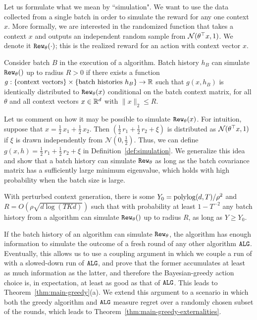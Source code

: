 Let us formulate what we mean by ``simulation". We want to use the data collected from a single batch in order to simulate the reward for any one context $x$. More formally, we are interested in the randomized function that takes a context $x$ and outputs an independent random sample from $\mathcal{N}(\theta^{\top} x, 1)$. We denote it $\mathtt{Rew}_{\theta}(\cdot)$; this is the realized reward for an action with context vector $x$.



\begin{definition}
Consider batch $B$ in the execution of a \GreedyStyle algorithm. Batch history $h_B$ can simulate $\mathtt{Rew}_{\theta}()$ up to radius $R>0$ if there exists a function
    $g: \{\text{context vectors}\}\times \{ \text{batch histories $h_B$}\} \to \mathbb{R}$
such that $g(x,h_B)$ is identically distributed to $\mathtt{Rew}_{\theta}(x)$ conditional on the batch context matrix, for all $\theta$ and all context vectors $x\in \mathbb{R}^d$ with $\|x\|_2\leq R$.
\label{def:simulation}
\end{definition}

Let us comment on how it may be possible to simulate $\mathtt{Rew}_{\theta}(x)$. For intuition, suppose that
    $x = \tfrac12\, x_1 + \tfrac12\, x_2$.
Then $(\tfrac12\, r_1 + \tfrac12\, r_2 + \xi)$ is distributed
as $\mathcal{N}(\theta^{\top} x, 1)$ if $\xi$ is drawn independently
from $\mathcal{N}(0, \tfrac12)$. Thus, we can define
    $g(x,h) = \tfrac12\, r_1 + \tfrac12\, r_2 + \xi$
in Definition~\ref{def:simulation}. We generalize this idea and
show that a batch history can simulate $\mathtt{Rew}_{\theta}$ as long as the batch covariance
matrix
has a sufficiently
large minimum eigenvalue, which holds with high probability
when the batch size is large. 


\begin{lemma}
 With perturbed context generation,
  there is some $Y_0 = \polylog(d, T)/\rho^2$ and
  $R = O(\rho \sqrt{d\log(TKd)}) $ such that with probability at least
  $1-T^{-2}$ any batch history from a
  \GreedyStyle algorithm can
    simulate $\mathtt{Rew}_{\theta}()$ up to radius $R$, as long as
    $Y\geq Y_0$.
    \label{lem:simulation}
\end{lemma}

If the batch history of an algorithm can simulate $\mathtt{Rew}_{\theta}$, the algorithm has enough information to simulate the outcome of a fresh round of any other algorithm
$\mathtt{ALG}$. Eventually, this allows us to use a coupling argument in which
we couple a run of \bg with a slowed-down run of $\mathtt{ALG}$, and prove
that the former accumulates at least as much information as the
latter, and therefore the Bayesian-greedy action choice is, in
expectation, at least as good as that of $\mathtt{ALG}$. This leads to
Theorem~\ref{thm:main-greedy}(a). We extend this argument to a
scenario in which both the greedy algorithm and $\mathtt{ALG}$ measure regret
over a randomly chosen subset of the rounds, which leads to
Theorem~\ref{thm:main-greedy-externalities}.

